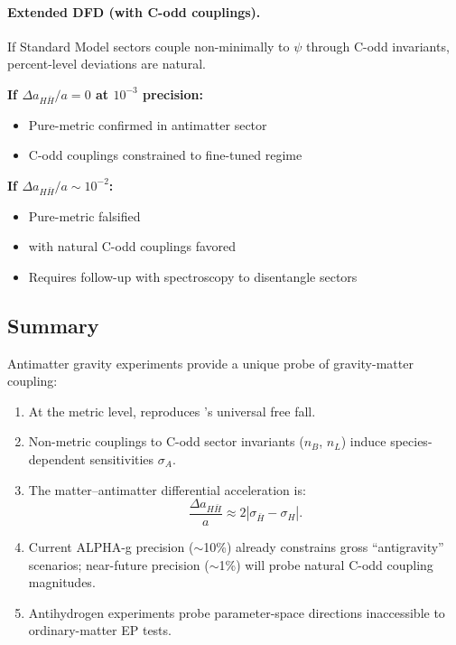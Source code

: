 \paragraph{Extended DFD (with C-odd couplings).}
If Standard Model sectors couple non-minimally to $\psi$ through C-odd 
invariants, percent-level deviations are natural.

\begin{tcolorbox}[colback=red!5!white, colframe=red!60!black, title=Antimatter Falsification Criteria]
\textbf{If $\Delta a_{H\bar{H}}/a = 0$ at $10^{-3}$ precision:}
\begin{itemize}
\item Pure-metric \GR confirmed in antimatter sector
\item \DFD C-odd couplings constrained to fine-tuned regime
\end{itemize}
\textbf{If $\Delta a_{H\bar{H}}/a \sim 10^{-2}$:}
\begin{itemize}
\item Pure-metric \GR falsified
\item \DFD with natural C-odd couplings favored
\item Requires follow-up with spectroscopy to disentangle sectors
\end{itemize}
\end{tcolorbox}

\subsection{Summary}\label{sec:antimatter-summary}

Antimatter gravity experiments provide a unique probe of gravity-matter 
coupling:
\begin{enumerate}
\item At the metric level, \DFD reproduces \GR's universal free fall.
\item Non-metric couplings to C-odd sector invariants ($n_B$, $n_L$) induce 
species-dependent sensitivities $\sigma_A$.
\item The matter--antimatter differential acceleration is:
\begin{equation}
\frac{\Delta a_{H\bar{H}}}{a} \approx 2|\sigma_{\bar{H}} - \sigma_H|.
\end{equation}
\item Current ALPHA-g precision ($\sim$10\%) already constrains gross 
``antigravity'' scenarios; near-future precision ($\sim$1\%) will probe 
natural C-odd coupling magnitudes.
\item Antihydrogen experiments probe parameter-space directions inaccessible 
to ordinary-matter EP tests.
\end{enumerate}

